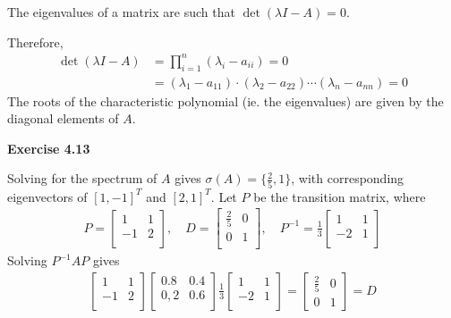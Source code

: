 \documentclass[letterpaper,12pt]{article}
\begin{document}
The eigenvalues of a matrix are such that $\det(\lambda I - A) = 0$.

Therefore, 
\begin{align*}
\det(\lambda I - A) &= \prod_{i=1}^n (\lambda_i - a_{ii}) = 0 \\
&= (\lambda_1 - a_{11}) \cdot (\lambda_2 - a_{22}) \cdots (\lambda_n - a_{nn}) = 0
\end{align*}
The roots of the characteristic polynomial (ie. the eigenvalues) are given by the diagonal elements of $A$.

\textbf{Exercise 4.13}

Solving for the spectrum of $A$ gives $\sigma(A) = \{\frac{2}{5}, 1 \}$, with corresponding eigenvectors of $[1, -1]^T$ and $[2, 1]^T$. Let $P$ be the transition matrix, where
\begin{align*}
P =
\begin{bmatrix}
1 & 1 \\
-1 & 2 \\
\end{bmatrix},
\quad
D =
\begin{bmatrix}
\frac{2}{5} & 0 \\
0 & 1 \\
\end{bmatrix},
\quad
P^{-1} = \frac{1}{3}
\begin{bmatrix}
1 & 1 \\
-2 & 1 \\
\end{bmatrix}
\end{align*}
Solving $P^{-1}AP$ gives
\begin{align*}
\begin{bmatrix}
	1 & 1 \\
	-1 & 2 \\
\end{bmatrix}
\begin{bmatrix}
	0.8 & 0.4 \\
	0,2 & 0.6 \\
\end{bmatrix}
\frac{1}{3}
\begin{bmatrix}
	1 & 1 \\
	-2 & 1 \\
\end{bmatrix}
=
\begin{bmatrix}
\frac{2}{5} & 0 \\
0 & 1
\end{bmatrix}
= D
\end{align*}
\end{document}
